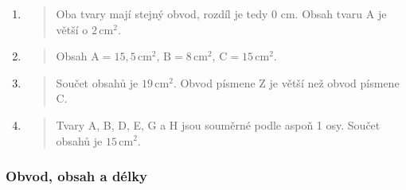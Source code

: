\begin{enumerate}
    \item
    \begin{quote}
        Oba tvary mají stejný obvod, rozdíl je tedy 0 cm.
        Obsah tvaru A je větší o $2\,\text{cm}^2$.
    \end{quote}

    \item
    \begin{quote}
        Obsah $\text{A} = 15,5\,\text{cm}^2$, $\text{B} = 8\,\text{cm}^2$, $\text{C} = 15\,\text{cm}^2$.
    \end{quote}

    \item
    \begin{quote}
        Součet obsahů je $19\,\text{cm}^2$.
        Obvod písmene Z je větší než obvod písmene C\@.
    \end{quote}

    \item
    \begin{quote}
        Tvary A, B, D, E, G a H jsou souměrné podle aspoň 1 osy.
        Součet obsahů je $15\,\text{cm}^2$.
    \end{quote}

\end{enumerate}

\newpage

\subsubsection{Obvod, obsah a délky}

